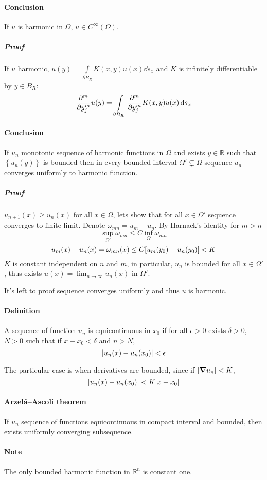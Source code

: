 \paragraph{Conclusion}
If $u$ is harmonic in $\Omega$, $u\in C^\infty(\Omega)$.
\subparagraph{Proof}
If $u$ harmonic, $u(y) = \int\limits_{\partial B_R} K(x,y)u(x) \dd{s_x} $ and $K$ is infinitely differentiable by $y\in B_R$:
$$\pdv[m]{y_j} u(y) = \int\limits_{\partial B_R} \pdv[m]{y_j} K(x,y)u(x) \dd{s_x} $$
\paragraph{Conclusion}
If $u_n$ monotonic sequence of harmonic functions in $\Omega$ and exists $y\in \mathbb{R}$ such that $\left\{ u_n(y)\right\}$ is bounded then in every bounded interval $\bar{\Omega}' \subsetneq \Omega$ sequence $u_n$ converges uniformly to harmonic function.
\subparagraph{Proof}
$u_{n+1}(x) \geq u_n(x)$ for all $x\in \Omega$, lets show that for all $x\in \Omega'$ sequence converges to finite limit. Denote $\omega_{mn} = u_m - u_n$. By Harnack's identity for $m>n$
$$\sup\limits_{\Omega'} \omega_{mn} \leq C \inf\limits_\Omega \omega_{mn}$$
$$u_m(x) - u_n(x) = \omega_{mn}(x) \leq C\qty[u_m(y_0)-u_n(y_0)] < K$$
$K$ is constant independent on $n$ and $m$, in particular, $u_n$ is bounded for all $x\in \Omega'$, thus exists $u(x) = \lim_{n \to \infty} u_n(x)$ in $\Omega'$.

It's left to proof sequence converges uniformly and thus $u$ is harmonic.
\paragraph{Definition} A sequence of function $u_n$ is equicontinuous in $x_0$ if for all $\epsilon>0$ exists $\delta>0$, $N>0$ such that if $x-x_0<\delta$ and $n>N$, 
$$\abs{u_n(x) - u_n(x_0)} < \epsilon$$

The particular case is when derivatives are bounded, since if $\abs{\grad u_n} < K$,
$$\abs{u_n(x) - u_n(x_0)} < K\abs{x-x_0}$$
\paragraph{Arzel\'{a}–Ascoli theorem }
If $u_n$ sequence of functions equicontinuous  in compact interval and bounded, then exists uniformly converging subsequence.
\paragraph{Note} The only bounded harmonic function in $\mathbb{R}^n$ is constant one.

